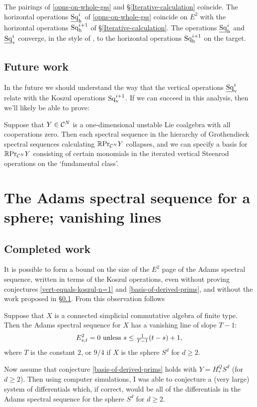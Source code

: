 \documentclass[11pt]{article}
\newcommand{\Sq}{\mathrm{Sq}}
\begin{document}
\begin{thm}
The pairings of \ref{opns-on-whole-gss} and \S\ref{Iterative-calculation} coincide. The horizontal operations $\underline{\Sq}_\textup{h}^i$ of \ref{opns-on-whole-gss} coincide on $E^2$ with the horizontal operations ${\Sq}_\textup{h}^{i+1}$ of \S\ref{Iterative-calculation}. The operations $\underline{\Sq}_\textup{h}^i$ and $\underline{\Sq}_\textup{v}^i$ converge, in the style of \cite{SingerSteen1.pdf}, to the horizontal operations ${\Sq}_\textup{h}^{i+1}$ on the target.
\end{thm}
\subsection{Future work}\label{work-on-kos-opns-n>1}
In the future we should understand the way that the vertical operations $\underline{\Sq}_\textup{v}^i$ relate with the Koszul operations $\Sq_\textup{v}^{i+1}$.
If we can succeed in this analysis, then we'll likely be able to prove:
\begin{conjecture}\label{basis-of-derived-prims}
Suppose that $Y\in\mathcal{C}^N$ is a one-dimensional unstable Lie coalgebra with all cooperations zero. Then each spectral sequence in the hierarchy of Grothendieck spectral sequences calculating $\mathbb{R}\textup{Pr}_{\mathcal{C}^N}Y$ collapses, and we can specify a basis for $\mathbb{R}\textup{Pr}_{\mathcal{C}^N}Y$ consisting of certain monomials in the iterated vertical Steenrod operations on the `fundamental class'.
\end{conjecture}

\section{The Adams spectral sequence for a sphere; vanishing lines}
\subsection{Completed work}
It is possible to form a bound on the size of the $E^2$ page of the Adams spectral sequence, written in terms of the Koszul operations, even without proving conjectures \ref{vert-equals-koszul-n=1} and \ref{basis-of-derived-prims}, and without the work proposed in \S\ref{work-on-kos-opns-n>1}. From this observation follows
\begin{thm}\label{vanishing-line-theorem}
Suppose that $X$ is a connected simplicial commutative algebra of finite type. %
Then the Adams spectral sequence for $X$ has a vanishing line of slope $T-1$:
\[E^2_{s,t}=0\textup{\ unless $s\leq\tfrac{1}{T-1}(t-s)+1$,}\]
where $T$ is the constant $2$, or $9/4$ if $X$ is the sphere $S^d$ for $d\geq2$.
\end{thm}
Now assume that conjecture \ref{basis-of-derived-prims} holds with $Y=H^Q_* S^d$ (for $d\geq2$). Then using computer simulations, I was able to conjecture a (very large) system of differentials which, if correct, would be all of the differentials in the Adams spectral sequence for the sphere $S^d$ for $d\geq2$.
\end{document}
